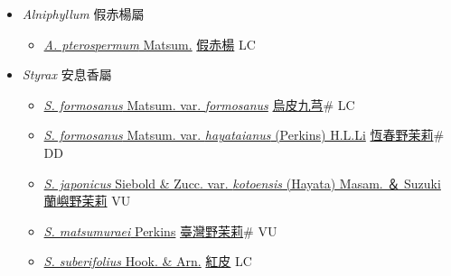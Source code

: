 
  \begin{itemize}
 \item[] \textit{Alniphyllum} 假赤楊屬
                    
  \begin{itemize}
        \item[] \href{http://www.theplantlist.org/tpl1.1/search?q=Alniphyllum+pterospermum}{\textit{A. pterospermum} Matsum.}   \href{\detokenize{http://taibnet.sinica.edu.tw/chi/taibnet_species_list.php?T2=假赤楊&T2_new_value=true&fr=y}}{假赤楊} LC
  \end{itemize}
 \item[] \textit{Styrax} 安息香屬
                    
  \begin{itemize}
        \item[] \href{http://www.theplantlist.org/tpl1.1/search?q=Styrax+formosanus+var.+formosanus}{\textit{S. formosanus} Matsum. var. \textit{formosanus}}   \href{\detokenize{http://taibnet.sinica.edu.tw/chi/taibnet_species_list.php?T2=烏皮九芎&T2_new_value=true&fr=y}}{烏皮九芎}\# LC
        \item[] \href{http://www.theplantlist.org/tpl1.1/search?q=Styrax+formosanus+var.+hayataianus}{\textit{S. formosanus} Matsum. var. \textit{hayataianus} (Perkins) H.L.Li}   \href{\detokenize{http://taibnet.sinica.edu.tw/chi/taibnet_species_list.php?T2=恆春野茉莉&T2_new_value=true&fr=y}}{恆春野茉莉}\# DD
        \item[] \href{http://www.theplantlist.org/tpl1.1/search?q=Styrax+japonicus+var.+kotoensis}{\textit{S. japonicus} Siebold \& Zucc. var. \textit{kotoensis} (Hayata) Masam. ＆ Suzuki}   \href{\detokenize{http://taibnet.sinica.edu.tw/chi/taibnet_species_list.php?T2=蘭嶼野茉莉&T2_new_value=true&fr=y}}{蘭嶼野茉莉} VU
        \item[] \href{http://www.theplantlist.org/tpl1.1/search?q=Styrax+matsumuraei}{\textit{S. matsumuraei} Perkins}   \href{\detokenize{http://taibnet.sinica.edu.tw/chi/taibnet_species_list.php?T2=臺灣野茉莉&T2_new_value=true&fr=y}}{臺灣野茉莉}\# VU
        \item[] \href{http://www.theplantlist.org/tpl1.1/search?q=Styrax+suberifolius}{\textit{S. suberifolius} Hook. \& Arn.}   \href{\detokenize{http://taibnet.sinica.edu.tw/chi/taibnet_species_list.php?T2=紅皮&T2_new_value=true&fr=y}}{紅皮} LC
  \end{itemize}
  \end{itemize}
